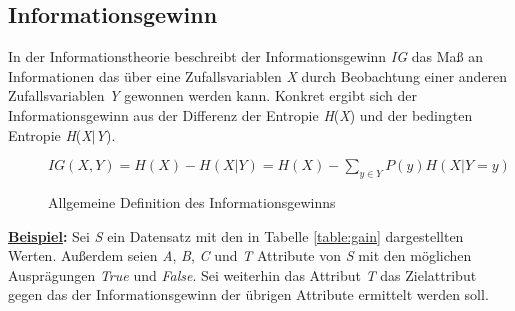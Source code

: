 \subsection{Informationsgewinn}
\label{id3:gain}
In der Informationstheorie beschreibt der Informationsgewinn \textit{IG} das Maß an Informationen das über eine Zufallsvariablen \textit{X} durch Beobachtung einer anderen Zufallsvariablen \textit{Y} gewonnen werden kann. \autocite{DataMining} Konkret ergibt sich der Informationsgewinn aus der Differenz der Entropie \textit{H}(\textit{X}) und der bedingten Entropie \textit{H}(\textit{X}$\vert$\textit{Y}). \autocites{DataMining}{Informat29:online}{QuinlanID3}

\begin{figure}[H]
    \label{fig:gain}
    \vspace{0.5cm}
    \centering
        $ IG(X,Y) = H(X) - H(X\vert Y) = H(X) - \sum\limits_{y\in Y} P(y)H(X\vert Y=y)$
    \caption{Allgemeine Definition des Informationsgewinns \autocites{DataMining}{ConditionalEntropy}}
\end{figure}

\textbf{\underline{Beispiel}:} Sei \textit{S} ein Datensatz mit den in Tabelle \ref{table:gain} dargestellten Werten. Außerdem seien \textit{A}, \textit{B}, \textit{C} und \textit{T} Attribute von \textit{S} mit den möglichen Ausprägungen \textit{True} und \textit{False}. Sei weiterhin das Attribut \textit{T} das Zielattribut gegen das der Informationsgewinn der übrigen Attribute ermittelt werden soll.

